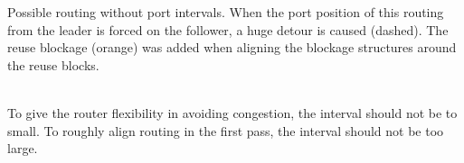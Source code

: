 \documentclass[a2paper]{bigsposter}
\begin{document}
\begin{blockrow}
\begin{enumerate}
\begin{minipage}{0.35\blockwidth}
\begin{tikzpicture}
	


	
	
	
	
	
	
\end{tikzpicture}	
\raggedright
{\tiny \begin{spacing}{0.9}
		Possible routing without port intervals. When the port position of this routing from the leader is forced on the follower, a huge detour is caused (dashed).
		The reuse blockage (orange) was added when aligning the blockage structures around the reuse blocks.
	\end{spacing}	}
\end{minipage}
\vspace{0.3cm}\\
To give the router flexibility in avoiding congestion, the interval should not be to small. To roughly align routing in the first pass, the interval should not be too large.



\end{enumerate}
\end{blockrow}
\end{document}
